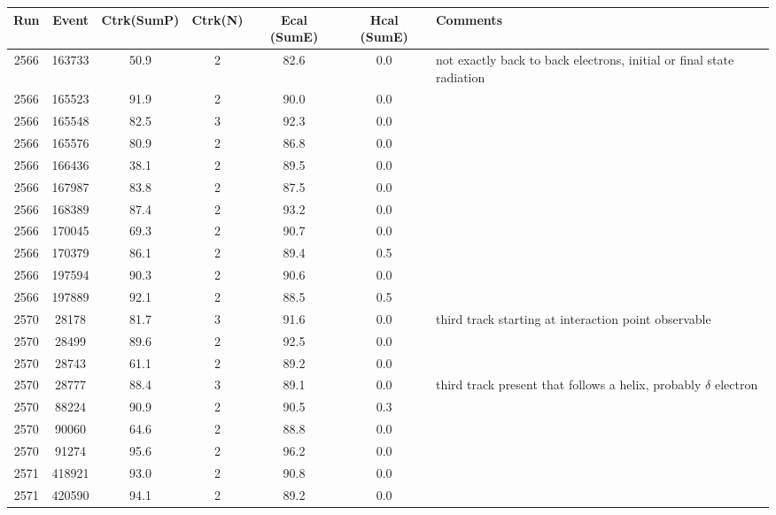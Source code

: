 \begin{tabular}{ccccccl}
	\toprule
	Run & Event & Ctrk(SumP) & Ctrk(N) & Ecal (SumE) & Hcal (SumE) & Comments \\
	\midrule
	2566 & 163733 & 50.9       & 2       & 82.6       & 0.0        &  not exactly back to back electrons, initial or final state radiation\\
	2566 & 165523 & 91.9       & 2       & 90.0       & 0.0        &  \\
	2566 & 165548 & 82.5       & 3       & 92.3       & 0.0        &  \\
	2566 & 165576 & 80.9       & 2       & 86.8       & 0.0        &  \\
	2566 & 166436 & 38.1       & 2       & 89.5       & 0.0        &  \korr{Bremsstrahlung?}\\
	2566 & 167987 & 83.8       & 2       & 87.5       & 0.0        &  \\
	2566 & 168389 & 87.4       & 2       & 93.2       & 0.0        &  \\
	2566 & 170045 & 69.3       & 2       & 90.7       & 0.0        &  \\
	2566 & 170379 & 86.1       & 2       & 89.4       & 0.5        &  \\
	2566 & 197594 & 90.3       & 2       & 90.6       & 0.0        &  \\
	2566 & 197889 & 92.1       & 2       & 88.5       & 0.5        &  \\
	2570 & 28178  & 81.7       & 3       & 91.6       & 0.0        &  third track starting at interaction point observable\\
	2570 & 28499  & 89.6       & 2       & 92.5       & 0.0        &  \\
	2570 & 28743  & 61.1       & 2       & 89.2       & 0.0        &  \korr{Bremsstrahlung?}\\
	2570 & 28777  & 88.4       & 3       & 89.1       & 0.0        &  third track present that follows a helix, probably $\delta$ electron\\
	2570 & 88224  & 90.9       & 2       & 90.5       & 0.3        &  \\
	2570 & 90060  & 64.6       & 2       & 88.8       & 0.0        &  \korr{Bremsstrahlung?}\\
	2570 & 91274  & 95.6       & 2       & 96.2       & 0.0        &  \\
	2571 & 418921 & 93.0       & 2       & 90.8       & 0.0        &  \\
	2571 & 420590 & 94.1       & 2       & 89.2       & 0.0        &  \\
	\bottomrule
\end{tabular}